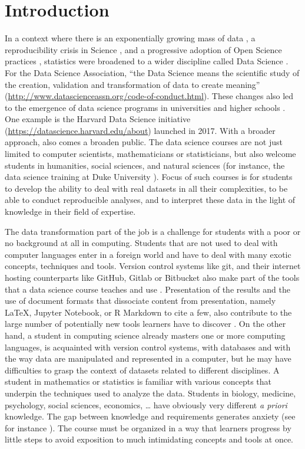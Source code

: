 \documentclass{aims}
\theoremstyle{definition}
\begin{document}
\hypertarget{introduction}{%
\section{Introduction}\label{introduction}}

In a context where there is an exponentially growing mass of data
\cite{Marx2013}, a reproducibility crisis in Science \cite{Baker2016},
and a progressive adoption of Open Science practices \cite{Banks2019},
statistics were broadened to a wider discipline called Data Science
\cite{Cleveland2001}. For the Data Science Association, ``the Data
Science means the scientific study of the creation, validation and
transformation of data to create meaning''
(\url{http://www.datascienceassn.org/code-of-conduct.html}). These
changes also led to the emergence of data science programs in
universities and higher schools \cite{Donoho2017, Cetinkaya-Rundel2021}.
One example is the Harvard Data Science initiative
(\url{https://datascience.harvard.edu/about}) launched in 2017. With a
broader approach, also comes a broaden public. The data science courses
are not just limited to computer scientists, mathematicians or
statisticians, but also welcome students in humanities, social sciences,
and natural sciences (for instance, the data science training at Duke
University \cite{Cetinkaya-Rundel2021}). Focus of such courses is for
students to develop the ability to deal with real datasets in all their
complexities, to be able to conduct reproducible analyses, and to
interpret these data in the light of knowledge in their field of
expertise.

The data transformation part of the job is a challenge for students with
a poor or no background at all in computing. Students that are not used
to deal with computer languages enter in a foreign world and have to
deal with many exotic concepts, techniques and tools. Version control
systems like git, and their internet hosting counterparts like GitHub,
Gitlab or Bitbucket also make part of the tools that a data science
course teaches and use \cite{Fiksel2019, Hsing2019}. Presentation of the
results and the use of document formats that dissociate content from
presentation, namely LaTeX, Jupyter Notebook, or R Markdown to cite a
few, also contribute to the large number of potentially new tools
learners have to discover \cite{Baumer2014}. On the other hand, a
student in computing science already masters one or more computing
languages, is acquainted with version control systems, with databases
and with the way data are manipulated and represented in a computer, but
he may have difficulties to grasp the context of datasets related to
different disciplines. A student in mathematics or statistics is
familiar with various concepts that underpin the techniques used to
analyze the data. Students in biology, medicine, psychology, social
sciences, economics, \ldots{} have obviously very different \emph{a
priori} knowledge. The gap between knowledge and requirements generates
anxiety (see for instance \cite{Onwuegbuzie2003}). The course must be
organized in a way that learners progress by little steps to avoid
exposition to much intimidating concepts and tools at once.
\end{document}
